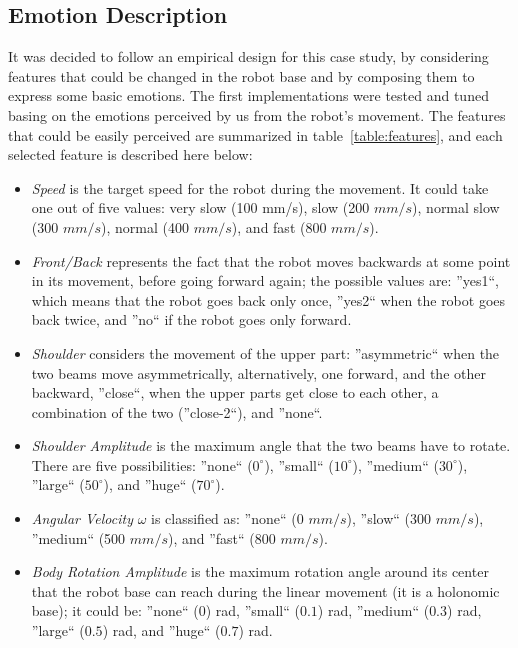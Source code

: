 
\subsection{Emotion Description}

It was decided to follow an empirical design for this case study, by considering features that could be changed in the robot base and by composing them to express some basic emotions. The first implementations were tested and tuned basing on the emotions perceived by us from the robot's movement. The features that could be easily perceived are summarized in table~\ref{table:features}, and each selected feature is described here below:

\begin{itemize}

	\item \textit{Speed} is the target speed for the robot during the movement. It could take one out of five values: very slow (100 mm/s), slow (200 $mm/s$), normal slow (300 $mm/s$), normal (400 $mm/s$), and fast (800 $mm/s$).

	\item \textit{Front/Back} represents the fact that the robot moves backwards at some point in its movement, before going forward again; the possible values are: ''yes1``, which means that the robot goes back only once, ''yes2`` when the robot goes back twice, and ''no`` if the robot goes only forward.

	\item \textit{Shoulder} considers the movement of the upper part: ''asymmetric`` when the two beams move asymmetrically, alternatively, one forward, and the other backward, ''close``, when the upper parts get close to each other, a combination of the two (''close-2``), and ''none``. 

	\item \textit{Shoulder Amplitude} is the maximum angle that the two beams have to rotate. There are five possibilities: ''none`` ($0^\circ$), ''small`` ($10^\circ$), ''medium`` ($30^\circ$), ''large`` ($50^\circ$), and ''huge`` ($70^\circ$).

	\item \textit{Angular Velocity} $\omega$ is classified as: ''none`` (0 $mm/s$), ''slow`` (300 $mm/s$), ''medium`` (500 $mm/s$), and ''fast`` (800 $mm/s$).

	\item \textit{Body Rotation Amplitude} is the maximum  rotation angle around its center that the robot base can reach during the linear movement (it is a holonomic base); it could be: ''none`` ($0$) rad, ''small`` ($0.1$) rad, ''medium`` ($0.3$) rad, ''large`` ($0.5$) rad, and ''huge`` ($0.7$) rad.
\end{itemize}

